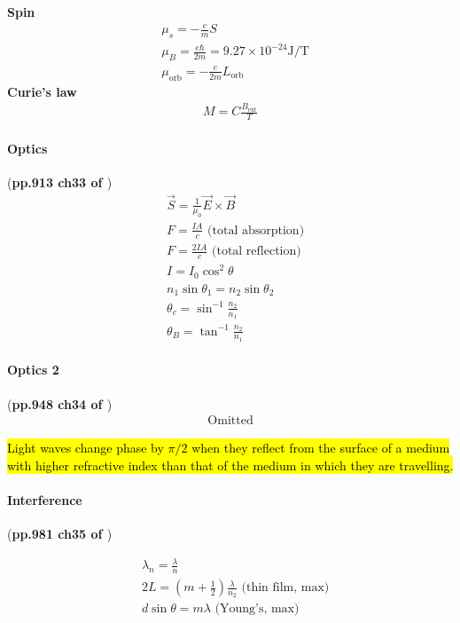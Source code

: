 \documentclass{article}
\numberwithin{equation}{subsection} %
\theoremstyle{definition}
\begin{document}
\textbf{Spin}
\begin{align}
    & \mu_s = -\frac{e}{m} S \\
    & \mu_B = \frac{e\hbar}{2m} = 9.27\times 10^{-24} \text{J/T} \\
    & \mu_\text{orb} = -\frac{e}{2m} L_\text{orb}
\end{align}
\textbf{Curie's law} 
\begin{align}
    M = C\frac{B_\text{ext}}{T}
\end{align}

\paragraph{Optics} (\textbf{pp.913 ch33 of \cite{book}})
\begin{align}
    & \vec{S} = \frac{1}{\mu_0} \vec{E}\times\vec{B} \\
    & F = \frac{IA}{c} \text{ (total absorption)} \\
    & F = \frac{2IA}{c} \text{ (total reflection)} \\
    & I = I_0 \cos^2{\theta} \\
    & n_1 \sin{\theta_1} = n_2 \sin{\theta_2} \\
    & \theta_c = \sin^{-1}\frac{n_2}{n_1} \\
    & \theta_B = \tan^{-1}\frac{n_2}{n_1}
\end{align}

\paragraph{Optics 2} (\textbf{pp.948 ch34 of \cite{book}})
\begin{align}
    \text{Omitted}
\end{align}

\hl{Light waves change phase by $\pi/2$ when they reflect from the surface of
a medium with higher refractive index than that of the medium in which
they are travelling.}

\paragraph{Interference} (\textbf{pp.981 ch35 of \cite{book}})

\begin{align}
    & \lambda_n = \frac{\lambda}{n} \\
    & 2L = (m+\frac{1}{2})\frac{\lambda}{n_2} \text{ (thin film, max)}
    \\
    & d\sin{\theta} = m\lambda \text{ (Young's, max)}
\end{align}
\end{document}
